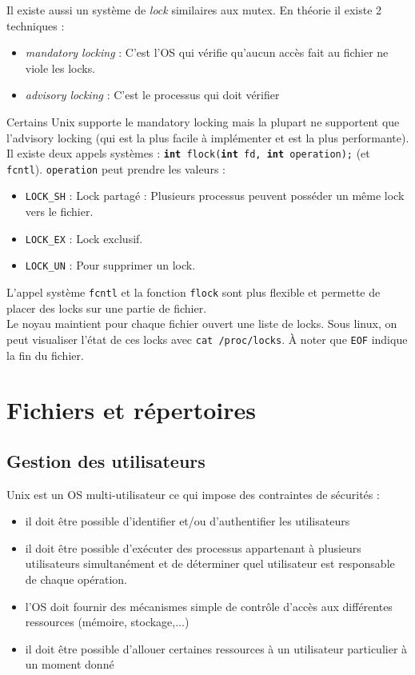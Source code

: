 Il existe aussi un système de \textit{lock} similaires aux mutex. En théorie il existe 2 techniques :
\begin{itemize}
  \item \textit{mandatory locking} : C'est l'OS qui vérifie qu'aucun accès fait au fichier ne viole les locks.
  \item \textit{advisory locking} : C'est le processus qui doit vérifier
\end{itemize}
Certains Unix supporte le mandatory locking mais la plupart ne supportent que l'advisory locking (qui est la plus facile à implémenter et est la plus performante). \\
Il existe deux appels systèmes : \texttt{\textbf{int} flock(\textbf{int} fd, \textbf{int} operation);} (et \texttt{fcntl}). \texttt{operation} peut prendre les valeurs :
\begin{itemize}
  \item \texttt{LOCK\_SH} : Lock partagé : Plusieurs processus peuvent posséder un même lock vers le fichier.
  \item \texttt{LOCK\_EX} : Lock exclusif.
  \item \texttt{LOCK\_UN} : Pour supprimer un lock.
\end{itemize}
L'appel système \texttt{fcntl} et la fonction \texttt{flock} sont plus flexible et permette de placer des locks sur une partie de fichier.\\

Le noyau maintient pour chaque fichier ouvert une liste de locks. Sous linux, on peut visualiser l'état de ces locks avec \texttt{cat /proc/locks}. À noter que \texttt{EOF} indique la fin du fichier.



\section{Fichiers et répertoires}

\subsection{Gestion des utilisateurs}
Unix est un OS multi-utilisateur ce qui impose des contraintes de sécurités :
\begin{itemize}
  \item il doit être possible d'identifier et/ou d'authentifier les utilisateurs
  \item il doit être possible d'exécuter des processus appartenant à plusieurs utilisateurs simultanément et de déterminer quel utilisateur est responsable de chaque opération.
  \item l'OS doit fournir des mécanismes simple de contrôle d'accès aux différentes ressources (mémoire, stockage,...)
  \item il doit être possible d'allouer certaines ressources à un utilisateur particulier à un moment donné
\end{itemize}

